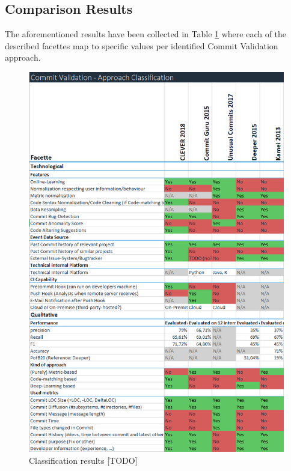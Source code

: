 

\subsection{Comparison Results}

The aforementioned results have been collected in Table \ref{fig:classification} where each of the described facettes map to specific values per identified Commit Validation approach.

\begin{figure}[H]
	\centering
	\includegraphics[width=15cm]{images/classification}
	\caption{Classification results [TODO]}
	\label{fig:classification}
\end{figure}

